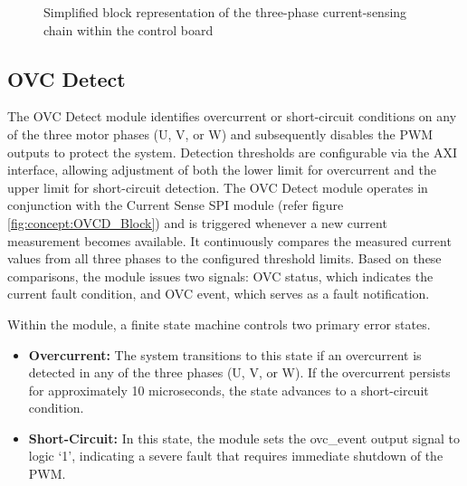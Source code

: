 \begin{figure}[H]
			\caption{Simplified block representation of the three-phase current-sensing chain within the control board}
			\label{fig:concept:CurrentSense_Block}
		\end{figure}

\subsection{\acs{OVC} Detect}
\label{sec:Conecpt:UnderstandingDUTs:OVC_Detect}
	
	The \acs{OVC} Detect module identifies overcurrent or short-circuit conditions on any of the three motor phases (U, V, or W) and subsequently disables the \acs{PWM} outputs to protect the system. Detection thresholds are configurable via the \acs{AXI} interface, allowing adjustment of both the lower limit for overcurrent and the upper limit for short-circuit detection. The \acs{OVC} Detect module operates in conjunction with the Current Sense \acs{SPI} module (refer figure \ref{fig:concept:OVCD_Block}) and is triggered whenever a new current measurement becomes available. It continuously compares the measured current values from all three phases to the configured threshold limits. Based on these comparisons, the module issues two signals: \acs{OVC} status, which indicates the current fault condition, and \acs{OVC} event, which serves as a fault notification.
	
	Within the module, a finite state machine controls two primary error states.
\begin{itemize}
\item \textbf{Overcurrent:} The system transitions to this state if an overcurrent is detected in any of the three phases (U, V, or W). If the overcurrent persists for approximately 10 microseconds, the state advances to a short-circuit condition.	
\item \textbf{Short-Circuit:} In this state, the module sets the ovc\_event output signal to logic ‘1’, indicating a severe fault that requires immediate shutdown of the \acs{PWM}.
\end{itemize}

